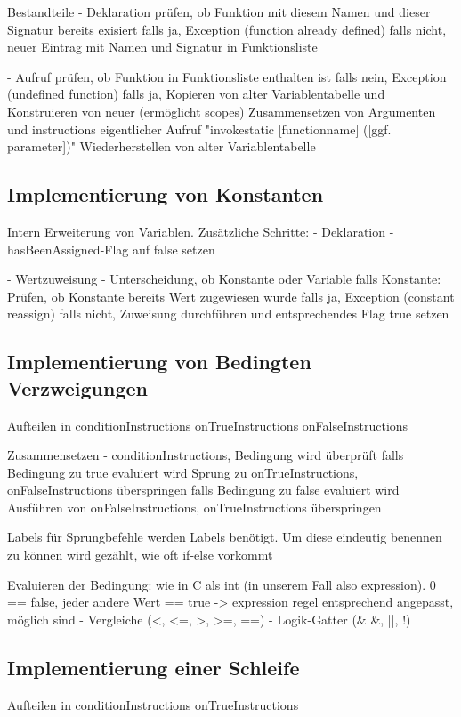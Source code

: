 Bestandteile
	-	Deklaration
			prüfen, ob Funktion mit diesem Namen und dieser Signatur bereits exisiert
				falls ja, Exception (function already defined)
				falls nicht, neuer Eintrag mit Namen und Signatur in Funktionsliste

	- 	Aufruf			
			prüfen, ob Funktion in Funktionsliste enthalten ist
				falls nein, Exception (undefined function)
				falls ja, 
					Kopieren von alter Variablentabelle und Konstruieren von neuer (ermöglicht scopes)
					Zusammensetzen von Argumenten und instructions
					eigentlicher Aufruf "invokestatic [functionname] ([ggf. parameter])"
					Wiederherstellen von alter Variablentabelle

\subsection{Implementierung von Konstanten}
Intern Erweiterung von Variablen.
Zusätzliche Schritte:
	-	Deklaration
		-	hasBeenAssigned-Flag auf false setzen

	-	Wertzuweisung
		-	Unterscheidung, ob Konstante oder Variable
				falls Konstante:
					Prüfen, ob Konstante bereits Wert zugewiesen wurde
						falls ja, Exception (constant reassign)
						falls nicht, Zuweisung durchführen und entsprechendes Flag true setzen

\subsection{Implementierung von Bedingten Verzweigungen}
Aufteilen in
	conditionInstructions
	onTrueInstructions
	onFalseInstructions
	
Zusammensetzen
	-	conditionInstructions, Bedingung wird überprüft
		falls Bedingung zu true evaluiert wird
			Sprung zu onTrueInstructions, onFalseInstructions überspringen
		falls Bedingung zu false evaluiert wird
			Ausführen von onFalseInstructions, onTrueInstructions überspringen
	
Labels
	für Sprungbefehle werden Labels benötigt. Um diese eindeutig benennen zu können wird gezählt, wie oft if-else vorkommt
	


Evaluieren der Bedingung:
	wie in C als int (in unserem Fall also expression). 0 == false, jeder andere Wert == true
	 	-> expression regel entsprechend angepasst, möglich sind
	 		- Vergleiche (<, <=, >, >=, ==)
	 		- Logik-Gatter (\& \&, ||, !)


\subsection{Implementierung einer Schleife}
Aufteilen in
	conditionInstructions
	onTrueInstructions
	
